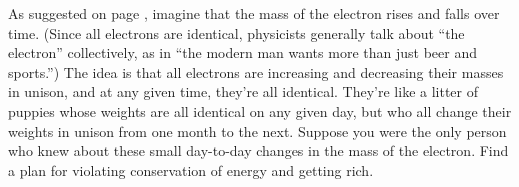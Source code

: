 As suggested on page \pageref{text:changing-electron-mass}, imagine that the mass of
the electron rises and falls over time. (Since all electrons are identical, physicists
generally talk about ``the electron'' collectively, as in ``the modern man wants more
than just beer and sports.'') The idea is that all electrons are increasing and
decreasing their masses in unison, and at any given time, they're all identical. They're
like a litter of puppies whose weights are all identical on any given day, but who all
change their weights in unison from one month to the next.
Suppose you were the only person who knew about these small day-to-day changes in the
mass of the electron. Find a plan for violating conservation of energy and getting
rich.
